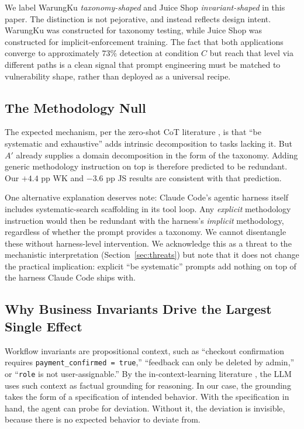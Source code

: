 \documentclass[conference]{IEEEtran}
\begin{document}
We label WarungKu \emph{taxonomy-shaped} and Juice Shop \emph{invariant-shaped} in this paper. The distinction is not pejorative, and instead reflects design intent. WarungKu was constructed for taxonomy testing, while Juice Shop was constructed for implicit-enforcement training. The fact that both applications converge to approximately $73\%$ detection at condition $C$ but reach that level via different paths is a clean signal that prompt engineering must be matched to vulnerability shape, rather than deployed as a universal recipe.

\subsection{The Methodology Null}

The expected mechanism, per the zero-shot CoT literature \cite{wei2022cot, kojima2022zeroshot}, is that ``be systematic and exhaustive'' adds intrinsic decomposition to tasks lacking it. But $A'$ already supplies a domain decomposition in the form of the taxonomy. Adding generic methodology instruction on top is therefore predicted to be redundant. Our $+4.4$ pp WK and $-3.6$ pp JS results are consistent with that prediction.

One alternative explanation deserves note: Claude Code's agentic harness itself includes systematic-search scaffolding in its tool loop. Any \emph{explicit} methodology instruction would then be redundant with the harness's \emph{implicit} methodology, regardless of whether the prompt provides a taxonomy. We cannot disentangle these without harness-level intervention. We acknowledge this as a threat to the mechanistic interpretation (Section~\ref{sec:threats}) but note that it does not change the practical implication: explicit ``be systematic'' prompts add nothing on top of the harness Claude Code ships with.

\subsection{Why Business Invariants Drive the Largest Single Effect}

Workflow invariants are propositional context, such as ``checkout confirmation requires \texttt{payment\_confirmed = true},'' ``feedback can only be deleted by admin,'' or ``\texttt{role} is not user-assignable.'' By the in-context-learning literature \cite{brown2020gpt3, petroni2019, lewis2020rag}, the LLM uses such context as factual grounding for reasoning. In our case, the grounding takes the form of a specification of intended behavior. With the specification in hand, the agent can probe for deviation. Without it, the deviation is invisible, because there is no expected behavior to deviate from.
\end{document}
